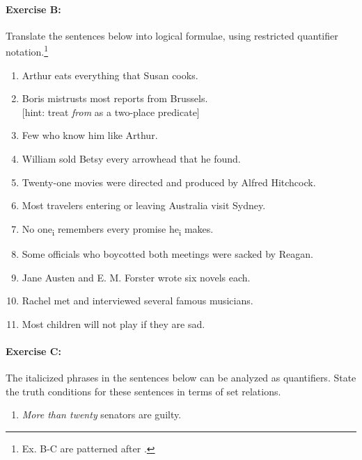 {{\paragraph*{Exercise B:} Translate the sentences below into logical formulae, using restricted quantifier notation.\footnote{Ex. B-C are patterned after \citet[89--90]{Kearns2000}.} 

\begin{enumerate}

\item Arthur eats everything that Susan cooks.


\item Boris mistrusts most reports from Brussels.\\
{}[hint: treat \textit{from} as a two-place predicate]
\item Few who know him like Arthur.
\item William sold Betsy every arrowhead that he found.
\item Twenty-one movies were directed and produced by Alfred Hitchcock.
\item Most travelers entering or leaving Australia visit Sydney.
\item No one\textsubscript{i} remembers every promise he\textsubscript{i} makes.
\item Some officials who boycotted both meetings were sacked by Reagan.
\item Jane Austen and E. M. Forster wrote six novels each.
\item Rachel met and interviewed several famous musicians.
\item Most children will not play if they are sad.
\end{enumerate}

\paragraph*{Exercise C:} The italicized phrases in the sentences below can be analyzed as quantifiers. State the truth conditions for these sentences in terms of set relations. 


\begin{enumerate}
\item \textit{More than twenty}  senators are guilty.   



\end{enumerate}}}
